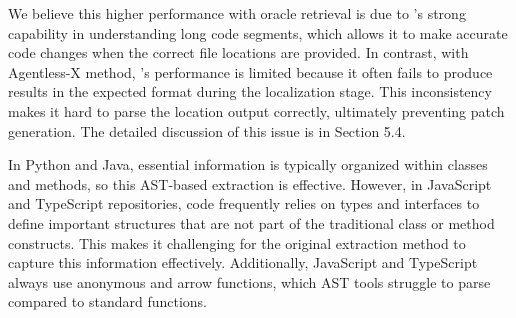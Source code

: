 \documentclass[12pt,american]{article}
\begin{document}
\begin{revresponse}
\begin{enumerate}
\begin{changes}

 We believe this higher performance with oracle retrieval is due to \Claude's strong capability in understanding long code segments, which allows it to make accurate code changes when the correct file locations are provided. In contrast, with Agentless-X method, \Claude's performance is limited because it often fails to produce results in the expected format during the localization stage. This inconsistency makes it hard to parse the location output correctly, ultimately preventing patch generation. The detailed discussion of this issue is in Section 5.4. 

  In Python and Java, essential information is typically organized within classes and methods, so this AST-based extraction is effective. However, in JavaScript and TypeScript repositories, code frequently relies on types and interfaces to define important structures that are not part of the traditional class or method constructs. This makes it challenging for the original extraction method to capture this information effectively. Additionally, JavaScript and TypeScript always use anonymous and arrow functions, which AST tools struggle to parse compared to standard functions.  


\end{changes}
\end{enumerate}
\end{revresponse}
\end{document}
